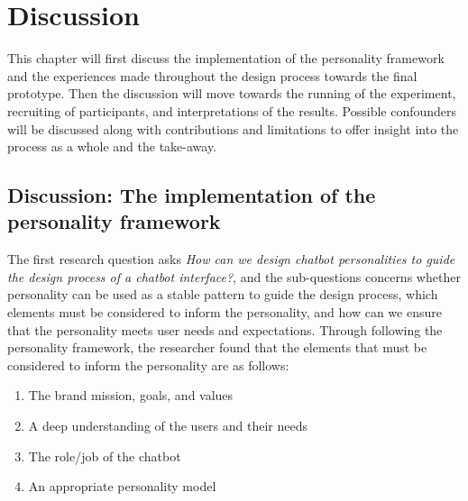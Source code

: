 \chapter{Discussion}
\label{chap:discussion}

This chapter will first discuss the implementation of the personality framework and the experiences made throughout the design process towards the final prototype. Then the discussion will move towards the running of the experiment, recruiting of  participants, and interpretations of the results. Possible confounders will be discussed along with contributions and limitations to offer insight into the process as a whole and the take-away. 

\section{Discussion: The implementation of the personality framework}

The first research question asks \textit{How can we design chatbot personalities to guide the design process of a chatbot interface?}, and the sub-questions concerns whether personality can be used as a stable pattern to guide the design process, which elements must be considered to inform the personality, and how can we ensure that the personality meets user needs and expectations. Through following the personality framework, the researcher found that the elements that must be considered to inform the personality are as follows:

\begin{enumerate}
    \item The brand mission, goals, and values
    \item A deep understanding of the users and their needs
    \item The role/job of the chatbot
    \item An appropriate personality model
\end{enumerate}

